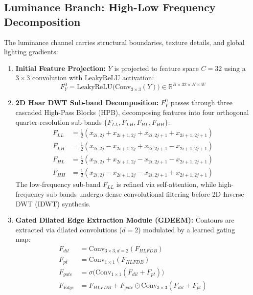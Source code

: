 \documentclass[10pt,twocolumn,letterpaper]{article}
\begin{document}
\subsection{Luminance Branch: High-Low Frequency Decomposition}
The luminance channel carries structural boundaries, texture details, and global lighting gradients:
\begin{enumerate}
    \item \textbf{Initial Feature Projection:} $Y$ is projected to feature space $C = 32$ using a $3\times3$ convolution with LeakyReLU activation:
    \begin{equation}
    F_Y^0 = \text{LeakyReLU}\big( \text{Conv}_{3\times3}(Y) \big) \in \mathbb{R}^{B \times 32 \times H \times W}
    \end{equation}
    \item \textbf{2D Haar DWT Sub-band Decomposition:} $F_Y^0$ passes through three cascaded High-Pass Blocks (HPB), decomposing features into four orthogonal quarter-resolution sub-bands $\{F_{LL}, F_{LH}, F_{HL}, F_{HH}\}$:
    \begin{align}
    F_{LL} &= \tfrac{1}{2}(x_{2i,2j} + x_{2i+1,2j} + x_{2i,2j+1} + x_{2i+1,2j+1}) \\
    F_{LH} &= \tfrac{1}{2}(x_{2i,2j} - x_{2i+1,2j} + x_{2i,2j+1} - x_{2i+1,2j+1}) \\
    F_{HL} &= \tfrac{1}{2}(x_{2i,2j} + x_{2i+1,2j} - x_{2i,2j+1} - x_{2i+1,2j+1}) \\
    F_{HH} &= \tfrac{1}{2}(x_{2i,2j} - x_{2i+1,2j} - x_{2i,2j+1} + x_{2i+1,2j+1})
    \end{align}
    The low-frequency sub-band $F_{LL}$ is refined via self-attention, while high-frequency sub-bands undergo dense convolutional filtering before 2D Inverse DWT (IDWT) synthesis.
    \item \textbf{Gated Dilated Edge Extraction Module (GDEEM):} Contours are extracted via dilated convolutions ($d=2$) modulated by a learned gating map:
    \begin{align}
    F_{dil} &= \text{Conv}_{3\times3, d=2}(F_{HLFDB}) \\
    F_{pt} &= \text{Conv}_{1\times1}(F_{HLFDB}) \\
    F_{gate} &= \sigma\big( \text{Conv}_{1\times1}(F_{dil} + F_{pt}) \big) \\
    F_{Edge} &= F_{HLFDB} + F_{gate} \odot \text{Conv}_{3\times3}(F_{dil} + F_{pt})
    \end{align}
\end{enumerate}
\end{document}
